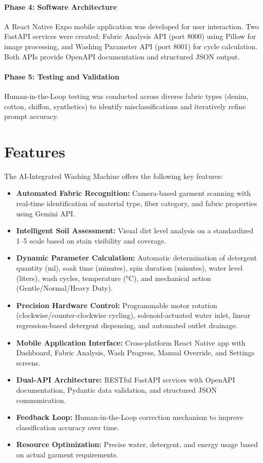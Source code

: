 \paragraph{Phase 4: Software Architecture}
A React Native Expo mobile application was developed for user interaction. Two FastAPI services were created: Fabric Analysis API (port 8000) using Pillow for image processing, and Washing Parameter API (port 8001) for cycle calculation. Both APIs provide OpenAPI documentation and structured JSON output.

\paragraph{Phase 5: Testing and Validation}
Human-in-the-Loop testing was conducted across diverse fabric types (denim, cotton, chiffon, synthetics) to identify misclassifications and iteratively refine prompt accuracy.

\section{Features}
The AI-Integrated Washing Machine offers the following key features:
\begin{itemize}
    \item \textbf{Automated Fabric Recognition:} Camera-based garment scanning with real-time identification of material type, fiber category, and fabric properties using Gemini API.
    \item \textbf{Intelligent Soil Assessment:} Visual dirt level analysis on a standardized 1–5 scale based on stain visibility and coverage.
    \item \textbf{Dynamic Parameter Calculation:} Automatic determination of detergent quantity (ml), soak time (minutes), spin duration (minutes), water level (liters), wash cycles, temperature (°C), and mechanical action (Gentle/Normal/Heavy Duty).
    \item \textbf{Precision Hardware Control:} Programmable motor rotation (clockwise/counter-clockwise cycling), solenoid-actuated water inlet, linear regression-based detergent dispensing, and automated outlet drainage.
    \item \textbf{Mobile Application Interface:} Cross-platform React Native app with Dashboard, Fabric Analysis, Wash Progress, Manual Override, and Settings screens.
    \item \textbf{Dual-API Architecture:} RESTful FastAPI services with OpenAPI documentation, Pydantic data validation, and structured JSON communication.
    \item \textbf{Feedback Loop:} Human-in-the-Loop correction mechanism to improve classification accuracy over time.
    \item \textbf{Resource Optimization:} Precise water, detergent, and energy usage based on actual garment requirements.
\end{itemize}

